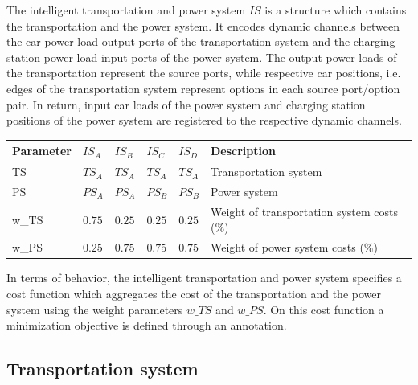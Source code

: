 The intelligent transportation and power system $IS$ is a structure which contains the transportation and the power system. It encodes dynamic channels between the car power load output ports of the transportation system and the charging station power load input ports of the power system. The output power loads of the transportation represent the source ports, while respective car positions, i.e. edges of the transportation system represent options in each source port/option pair. In return, input car loads of the power system and charging station positions of the power system are registered to the respective dynamic channels. 

\begin{table}[h]
	\renewcommand{\arraystretch}{1.3}
	\centering
	\begin{tabularx}{\columnwidth}{lllllX}
		\hline
		\textbf{Parameter}      & \textbf{$IS_{A}$} & \textbf{$IS_{B}$}  & \textbf{$IS_{C}$} & \textbf{$IS_{D}$}      & \textbf{Description} \\ \hline
		TS     					& $TS_{A}$   	& $TS_{A}$ & $TS_{A}$ & $TS_{A}$	 	& Transportation system     			\\
		PS               		& $PS_{A}$ 	& $PS_{A}$ & $PS_{B}$ & $PS_{B}$		& Power system   						\\
		w\_TS              & $0.75$  	& $0.25$ & $0.25$ & $0.25$		& Weight of transportation system costs (\%)	\\ 
		w\_PS              & $0.25$  	& $0.75$ & $0.75$ & $0.75$  		& Weight of power system costs (\%)   			\\ \hline
	\end{tabularx}
\end{table}

In terms of behavior, the intelligent transportation and power system specifies a cost function which aggregates the cost of the transportation and the power system using the weight parameters $w\_TS$ and $w\_PS$. On this cost function a minimization objective is defined through an annotation.

\subsection{Transportation system}

